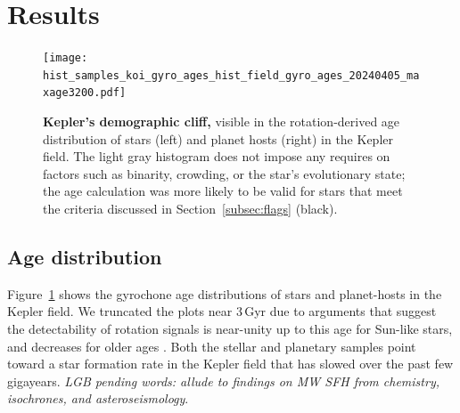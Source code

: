 \documentclass[11pt,twocolumn,tighten]{aastex63}
\begin{document}
\section{Results}
\label{sec:results}

\begin{figure}[!t]
	\begin{center}
		\leavevmode
		\texttt{[image: hist\_samples\_koi\_gyro\_ages\_hist\_field\_gyro\_ages\_20240405\_maxage3200.pdf]}
	\end{center}
	\vspace{-0.6cm}
	\caption{
		{\bf Kepler's demographic cliff,} visible in the
		rotation-derived age distribution of stars (left) and planet hosts
		(right) in the Kepler field.
		The
		light gray histogram does not impose any requires on factors such as
		binarity, crowding, or the star's evolutionary state;
		the age calculation was more likely to be valid for stars that meet the criteria
		discussed in Section~\ref{subsec:flags} (black).
		\label{fig:hist_tgyro}
	}
\end{figure}

\subsection{Age distribution}

Figure~\ref{fig:hist_tgyro} shows the gyrochone age distributions of
stars and planet-hosts in the Kepler field.
We truncated the plots near $3$\,Gyr due to arguments that suggest the
detectability of rotation signals is near-unity up to this age for
Sun-like stars, and decreases for older ages
\citep{2022ApJ...937...94M}.
Both the stellar and planetary samples point toward a star formation
rate in the Kepler field that has slowed over the past few gigayears.
{\it LGB pending words: allude to findings on MW SFH from chemistry,
isochrones, and asteroseismology}.

%
\end{document}
